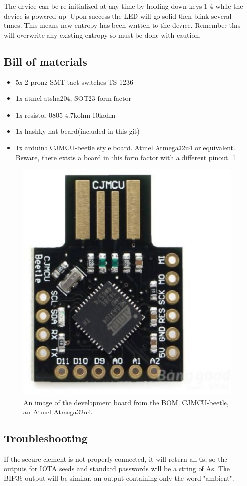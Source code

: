 \documentclass{article}
\begin{document}
The device can be re-initialized at any time by holding down keys 1-4 while the device is powered up. Upon success the LED will go solid then blink several times. This means new entropy has been written to the device. Remember this will overwrite any existing entropy so must be done with caution.


\subsection{Bill of materials}
\begin{itemize}
\item 5x 2 prong SMT tact switches TS-1236
\item 1x atmel atsha204, SOT23 form factor
\item 1x resistor 0805 4.7kohm-10kohm
\item 1x hashky hat board(included in this git)
\item 1x arduino CJMCU-beetle style board. Atmel Atmega32u4 or equivalent. Beware, there exists a board in this form factor with a different pinout. \ref{fig:cjmcu}
\end{itemize}


\begin{figure}
\centering
 \captionsetup{width=.7\linewidth}
\includegraphics[width=0.5\linewidth]{cjmcubeetle.eps}
\caption{An image of the development board from the BOM. CJMCU-beetle, an Atmel Atmega32u4. }
\label{fig:cjmcu}
\end{figure}


\subsection{Troubleshooting}

If the secure element is not properly connected, it will return all 0s, so the outputs for IOTA seeds and standard passwords will be a string of As. The BIP39 output will be similar, an output containing only the word "ambient". 
\end{document}
